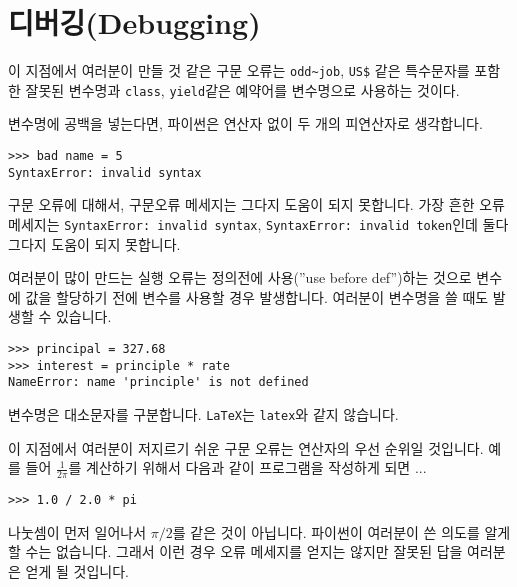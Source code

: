 \section{디버깅(Debugging)}

이 지점에서 여러분이 만들 것 같은 구문 오류는 \verb"odd~job", \verb"US$" 같은 특수문자를 포함한 잘못된 변수명과 {\tt class}, {\tt yield}같은 예약어를 변수명으로 사용하는 것이다. 


변수명에 공백을 넣는다면, 파이썬은 연산자 없이 두 개의 피연산자로 생각합니다.

\beforeverb
\begin{verbatim}
>>> bad name = 5
SyntaxError: invalid syntax
\end{verbatim}
\afterverb
%
구문 오류에 대해서, 구문오류 메세지는 그다지 도움이 되지 못합니다. 가장 흔한 오류 메세지는 {\tt SyntaxError: invalid syntax}, {\tt SyntaxError: invalid token}인데 둘다 그다지 도움이 되지 못합니다.


여러분이 많이 만드는 실행 오류는 정의전에 사용(''use before def'')하는 것으로 변수에 값을 할당하기 전에 변수를 사용할 경우 발생합니다. 여러분이 변수명을 쓸 때도 발생할 수 있습니다.

\beforeverb
\begin{verbatim}
>>> principal = 327.68
>>> interest = principle * rate
NameError: name 'principle' is not defined
\end{verbatim}
\afterverb
%
변수명은 대소문자를 구분합니다. {\tt LaTeX}는 {\tt latex}와 같지 않습니다.


이 지점에서 여러분이 저지르기 쉬운 구문 오류는 연산자의 우선 순위일 것입니다. 예를 들어 $\frac{1}{2 \pi}$를 계산하기 위해서 다음과 같이 프로그램을 작성하게 되면 ...


\beforeverb
\begin{verbatim}
>>> 1.0 / 2.0 * pi
\end{verbatim}
\afterverb
%
나눗셈이 먼저 일어나서 $\pi / 2$를 같은 것이 아닙니다. 파이썬이 여러분이 쓴 의도를 알게할 수는 없습니다. 그래서 이런 경우 오류 메세지를 얻지는 않지만 잘못된 답을 여러분은 얻게 될 것입니다.




